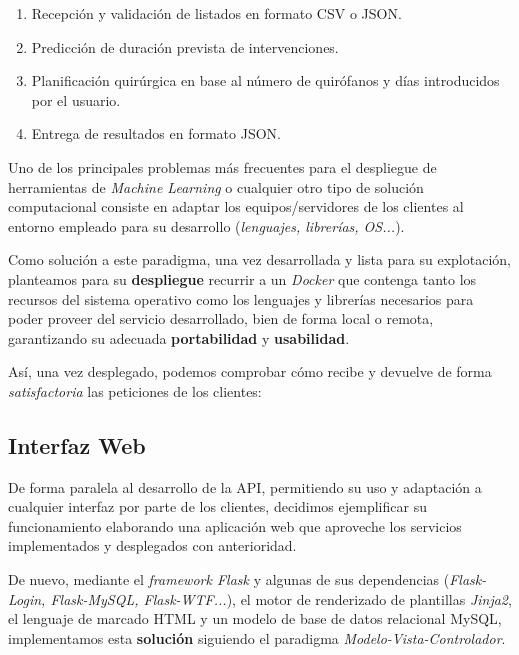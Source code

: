  \begin{enumerate}
     \item Recepción y validación de listados en formato CSV o JSON.
     \item Predicción de duración prevista de intervenciones.
     \item Planificación quirúrgica en base al número de quirófanos y días introducidos por el usuario.
     \item Entrega de resultados en formato JSON.
 \end{enumerate}

Uno de los principales problemas más frecuentes para el despliegue de herramientas de \textit{Machine Learning} o cualquier otro tipo de solución computacional consiste en adaptar los equipos/servidores de los clientes al entorno empleado para su desarrollo (\textit{lenguajes, librerías, OS...}). 

Como solución a este paradigma, una vez desarrollada y lista para su explotación, planteamos para su \textbf{despliegue} recurrir a un \textit{Docker} \cite{Merkel2014Docker:Deployment} que contenga tanto los recursos del sistema operativo como los lenguajes y librerías necesarios para poder proveer del servicio desarrollado, bien de forma local o remota, garantizando su adecuada \textbf{portabilidad} y \textbf{usabilidad}.

Así, una vez desplegado, podemos comprobar cómo recibe y devuelve de forma \textit{satisfactoria} las peticiones de los clientes:


\subsection{Interfaz Web}

De forma paralela al desarrollo de la API, permitiendo su uso y adaptación a cualquier interfaz por parte de los clientes, decidimos ejemplificar su funcionamiento elaborando una aplicación web que aproveche los servicios implementados y desplegados con anterioridad.

De nuevo, mediante el \textit{framework Flask} y algunas de sus dependencias (\textit{Flask-Login, Flask-MySQL, Flask-WTF...}), el motor de renderizado de plantillas \textit{Jinja2}, el lenguaje de marcado HTML y un modelo de base de datos relacional MySQL, implementamos esta \textbf{solución} siguiendo el paradigma \textit{Modelo-Vista-Controlador}.

